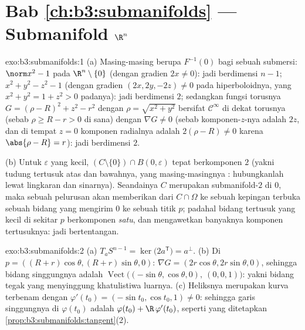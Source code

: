 \section*{Bab \ref{ch:b3:submanifolds} --- Submanifold
$\R^n$}

\begin{solution}{exo:b3:submanifolds:1}
(a) Masing-masing berupa $F^{-1}(0)$ bagi sebuah submersi: $\norm x^2 - 1$ pada
$\R^n\setminus\{0\}$ (dengan gradien $2x \neq 0$): jadi berdimensi $n-1$;
$x^2 + y^2 - z^2 - 1$ (dengan gradien $(2x, 2y, -2z) \neq 0$ pada
hiperboloidnya, yang $x^2 + y^2 = 1 + z^2 > 0$ padanya): jadi berdimensi $2$;
sedangkan fungsi torusnya $G = (\rho - R)^2 + z^2 - r^2$ dengan $\rho =
\sqrt{x^2+y^2}$ bersifat $\mathcal C^\infty$ di dekat torusnya (sebab $\rho
\geq R - r > 0$ di sana) dengan $\nabla G \neq 0$ (sebab
komponen-$z$-nya adalah $2z$, dan di tempat $z = 0$ komponen radialnya
adalah $2(\rho - R)\ne0$ karena $\abs{\rho - R} = r$): jadi berdimensi
$2$.

(b) Untuk $\varepsilon$ yang kecil,
$(C\setminus\{0\})\cap B(0,\varepsilon)$ tepat berkomponen 
$2$ (yakni tudung tertusuk atas dan bawahnya, yang masing-masingnya
: hubungkanlah lewat lingkaran dan sinarnya). Seandainya $C$
merupakan submanifold-$2$ di $0$, maka sebuah pelurusan akan memberikan
 dari $C\cap\Omega$ ke sebuah kepingan terbuka sebuah
bidang yang mengirim $0$ ke sebuah titik $p$; padahal  bidang
tertusuk yang kecil di sekitar $p$ berkomponen \emph{satu}, dan
 mengawetkan banyaknya komponen 
tertusuknya: jadi bertentangan.
\end{solution}

\begin{solution}{exo:b3:submanifolds:2}
(a) $T_aS^{n-1} = \ker\bigl(2a^{\mathsf T}\bigr) = a^\perp$.
(b) Di $p = ((R+r)\cos\theta, (R+r)\sin\theta, 0)$: $\nabla G
= (2r\cos\theta, 2r\sin\theta, 0)$, sehingga bidang singgungnya adalah
$\operatorname{Vect}\bigl((-\sin\theta, \cos\theta, 0),\ (0,
0, 1)\bigr)$: yakni bidang tegak yang menyinggung khatulistiwa
luarnya.
(c) Heliksnya merupakan kurva terbenam dengan $\varphi'(t_0) =
(-\sin t_0, \cos t_0, 1) \neq 0$: sehingga garis singgungnya di
$\varphi(t_0)$ adalah $\varphi(t_0) + \R\,\varphi'(t_0)$, seperti yang
ditetapkan \cref{prop:b3:submanifolds:tangent}(2).
\end{solution}


